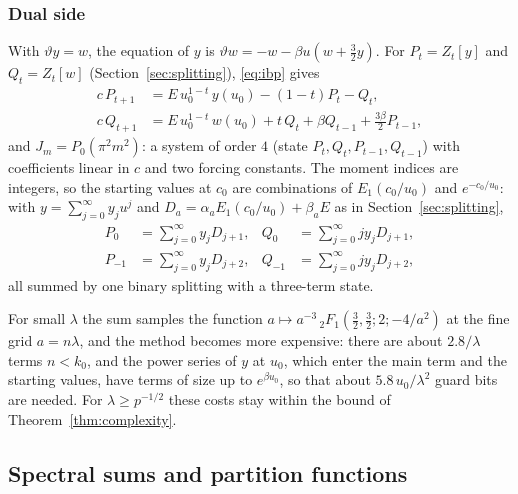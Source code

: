 \documentclass[11pt,reqno]{amsart}
\theoremstyle{definition}
\theoremstyle{remark}
\begin{document}
\subsubsection{Dual side} With $\vartheta y = w$, the equation of $y$ is $\vartheta w = -w - \beta u(w + \frac32 y)$. For
$P_t = Z_t[y]$ and $Q_t = Z_t[w]$ (Section~\ref{sec:splitting}), \eqref{eq:ibp} gives
\begin{align*}
  c\,P_{t+1} &= E\,u_0^{1-t}\,y(u_0) - (1-t)P_t - Q_t, \\
  c\,Q_{t+1} &= E\,u_0^{1-t}\,w(u_0) + t\,Q_t + \beta Q_{t-1} + \tfrac{3\beta}{2}P_{t-1},
\end{align*}
and $J_m = P_0(\pi^2m^2)$: a system of order $4$ (state $P_t, Q_t, P_{t-1}, Q_{t-1}$) with coefficients linear in $c$ and
two forcing constants. The moment indices are integers, so the starting values at $c_0$ are combinations of
$E_1(c_0/u_0)$ and $e^{-c_0/u_0}$: with $y = \sum_{j=0}^{\infty}y_ju^j$ and $D_a = \alpha_aE_1(c_0/u_0) + \beta_aE$ as in
Section~\ref{sec:splitting},
\begin{align*}
  P_0 &= \sum_{j=0}^{\infty}y_jD_{j+1}, & Q_0 &= \sum_{j=0}^{\infty} jy_jD_{j+1}, \\
  P_{-1} &= \sum_{j=0}^{\infty}y_jD_{j+2}, & Q_{-1} &= \sum_{j=0}^{\infty}jy_jD_{j+2},
\end{align*}
all summed by one binary splitting with a three-term state.

For small $\lambda$ the sum samples the function $a \mapsto a^{-3}\,{}_2F_1(\frac32,\frac32;2;-4/a^2)$ at the fine grid $a = n\lambda$, and the method
becomes more expensive: there are about $2.8/\lambda$ terms $n < k_0$, and the power series of $y$ at $u_0$, which
enter the main term and the starting values, have terms of size up to $e^{\beta u_0}$, so that about $5.8\,u_0/\lambda^2$ guard
bits are needed. For $\lambda \ge p^{-1/2}$ these costs stay within the bound of Theorem~\ref{thm:complexity}.

\subsection{Spectral sums and partition functions}\label{sec:physics}
\end{document}
